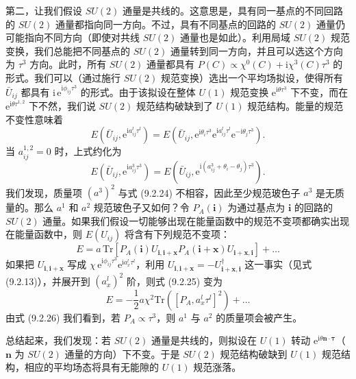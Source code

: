 第二，让我们假设 $SU(2)$ 通量是共线的。这意思是，具有同一基点的不同回路的 $SU(2)$ 通量都指向同一方向。不过，具有不同基点的回路的 $SU(2)$ 通量仍可能指向不同方向（即使对共线 $SU(2)$ 通量也是如此）。利用局域 $SU(2)$ 规范变换，我们总能把不同基点的 $SU(2)$ 通量转到同一方向，并且可以选这个方向为 $\tau^{3}$ 方向。此时，所有 $SU(2)$ 通量都具有 $P(C)\propto\chi^{0}(C)+\mathrm{i}\chi^{3}(C)\tau^{3}$ 的形式。我们可以（通过施行 $SU(2)$ 规范变换）选出一个平均场拟设，使得所有 $\bar{U}_{ij}$ 都具有 $\mathrm{i}\,\mathrm{e}^{\mathrm{i}\phi_{ij}\tau^{3}}$ 的形式。由于该拟设在整体 $U(1)$ 规范变换 $\mathrm{e}^{\mathrm{i}\theta\tau^{3}}$ 下不变，而在 $\mathrm{e}^{\mathrm{i}\theta\tau^{1,2}}$ 下不然，我们说 $SU(2)$ 规范结构破缺到了 $U(1)$ 规范结构。能量的规范不变性意味着
\begin{equation*}
E(\bar{U}_{ij},\mathrm{e}^{\mathrm{i}a_{ij}^{l}\tau^{l}})=E(\bar{U}_{ij},\mathrm{e}^{\mathrm{i}\theta_i\tau^{3}}\mathrm{e}^{\mathrm{i}a_{ij}^{l}\tau^{l}}\mathrm{e}^{-\mathrm{i}\theta_j\tau^{3}}).
\tag{9.2.23}
\end{equation*}
当 $a_{ij}^{1,2}=0$ 时，上式约化为
\begin{equation*}
E(\bar{U}_{ij},\mathrm{e}^{\mathrm{i}a_{ij}^{3}\tau^{3}})=E(\bar{U}_{ij},\mathrm{e}^{\mathrm{i}(a_{ij}^{3}+\theta_i-\theta_j)\tau^{3}}).
\tag{9.2.24}
\end{equation*}
我们发现，质量项 $(a^{3})^{2}$ 与式 (9.2.24) 不相容，因此至少规范玻色子 $a^{3}$ 是无质量的。那么 $a^{1}$ 和 $a^{2}$ 规范玻色子又如何？令 $P_A(\pmb{i})$ 为通过基点为 $\pmb{i}$ 的回路的 $SU(2)$ 通量。如果我们假设一切能够出现在能量函数中的规范不变项都确实出现在能量函数中，则 $E(U_{ij})$ 将含有下列规范不变项：
\begin{equation*}
E=a\,\mathrm{Tr}[P_A(\pmb{i})U_{\pmb{i},\pmb{i}+\pmb{x}}P_A(\pmb{i}+\pmb{x})U_{\pmb{i}+\pmb{x},\pmb{i}}]+\dots
\tag{9.2.25}
\end{equation*}
如果把 $U_{\pmb{i},\pmb{i}+\pmb{x}}$ 写成 $\chi\,\mathrm{e}^{\mathrm{i}\phi_{ij}\tau^{3}}\mathrm{e}^{\mathrm{i}a_{x}^{l}\tau^{l}}$，利用 $U_{\pmb{i},\pmb{i}+\pmb{x}}=-U_{\pmb{i}+\pmb{x},\pmb{i}}^{\dagger}$ 这一事实（见式 (9.2.13)），并展开到 $(a_{x}^{l})^{2}$ 阶，则式 (9.2.25) 变为
\begin{equation*}
E=-\frac{1}{2}a\chi^{2}\mathrm{Tr}([P_A,a_{x}^{l}\tau^{l}]^{2})+\dots
\tag{9.2.26}
\end{equation*}
由式 (9.2.26) 我们看到，若 $P_A\propto\tau^{3}$，则 $a^{1}$ 与 $a^{2}$ 的质量项会被产生。

总结起来，我们发现：若 $SU(2)$ 通量是共线的，则拟设在 $U(1)$ 转动 $\mathrm{e}^{\mathrm{i}\theta\pmb{n}\cdot\pmb{\tau}}$（$\pmb{n}$ 为 $SU(2)$ 通量的方向）下不变。于是 $SU(2)$ 规范结构破缺到 $U(1)$ 规范结构，相应的平均场态将具有无能隙的 $U(1)$ 规范涨落。

